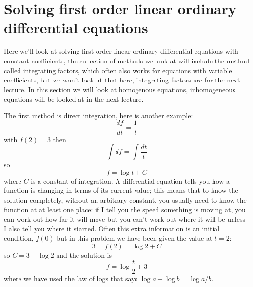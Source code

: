 \documentclass[12pt]{article}
\begin{document}
\section*{Solving first order linear ordinary differential equations}

Here we'll look at solving first order linear ordinary differential
equations with constant coefficients, the collection of methods we
look at will include the method called integrating factors, which
often also works for equations with variable coefficients, but we
won't look at that here, integrating factors are for the next
lecture. In this section we will look at homogenous equations,
inhomogeneous equations will be looked at in the next lecture.

The first method is direct integration, here is another example:
\begin{equation}
  \frac{df}{dt}=\frac{1}{t}
\end{equation}
with $f(2)=3$ then
\begin{equation}
  \int df = \int \frac{dt}{t}
\end{equation}
so
\begin{equation}
  f=\log{t}+C
\end{equation}
where $C$ is a constant of integration. A differential equation tells
you how a function is changing in terms of its current value; this
means that to know the solution completely, without an arbitrary
constant, you usually need to know the function at at least one place:
if I tell you the speed something is moving at, you can work out how
far it will move but you can't work out where it will be unless I also
tell you where it started. Often this extra information is an initial
condition, $f(0)$ but in this problem we have been given the value at
$t=2$:
\begin{equation}
  3=f(2)=\log{2}+C
\end{equation}
so $C=3-\log{2}$ and the solution is
\begin{equation}
  f=\log{\frac{t}{2}}+3
\end{equation}
where we have used the law of logs that says $\log{a}-\log{b}=\log{a/b}$.
\end{document}
